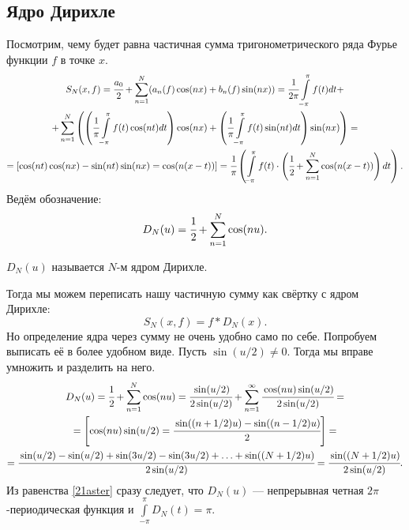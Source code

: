 \subsection{Ядро Дирихле}
Посмотрим, чему будет равна частичная сумма тригонометрического ряда Фурье функции $f$ в точке $x$.
\begin{gather}
	S_N(x,f) = \cfrac{a_0}{2} + \sum\limits_{n=1}^{N}(a_n(f) \cos(nx) + b_n(f) \sin(nx)) = \cfrac{1}{2\pi}\int\limits_{-\pi}^{\pi} f(t)dt +\\
	+\sum\limits_{n=1}^{N}\left(\left( \cfrac{1}{\pi}\int\limits_{-\pi}^{\pi}f(t)\cos(nt) dt\right)\cos(nx) +
	\left( \cfrac{1}{\pi}\int\limits_{-\pi}^{\pi}f(t)\sin(nt) dt\right)\sin(nx) \right) = \\
	= [\cos(nt)\cos(nx) - \sin(nt)\sin(nx) = \cos(n(x-t))] 
	=\cfrac{1}{\pi}\left( \int\limits_{-\pi}^{\pi}f(t) \cdot \left( \cfrac{1}{2} + \sum \limits_{n=1}^{N}\cos(n(x-t))\right)dt\right).
\end{gather}
Ведём обозначение:
$$
	D_N(u) = \cfrac{1}{2} + \sum\limits_{n=1}^{N}\cos (nu).
$$
\begin{Def}
	$D_N(u)$ называется $N$-м ядром Дирихле. 
\end{Def}
Тогда мы можем переписать нашу частичную сумму как свёртку с ядром Дирихле:
\[
	S_N(x, f) = f*D_N(x).\tag{*}
    \label{21aster}
\]
Но определение ядра через сумму не очень удобно само по себе. Попробуем выписать её в более удобном виде. Пусть $\sin(u/2) \neq 0$. Тогда мы вправе умножить и разделить на него.
\begin{gather}
	D_N(u) = \cfrac{1}{2} + \sum\limits_{n=1}^{N}\cos(nu) = \cfrac{\sin(u/2)}{2\sin(u/2)} + \sum\limits_{n=1}^{\infty} \cfrac{\cos(nu)\sin(u/2)}{2\sin(u/2)} =\\
	= \left[\cos(nu)\sin(u/2) = \cfrac{\sin((n + 1/2)u) - \sin((n-1/2)u)}{2}\right]=\\
	= \cfrac{\sin(u/2) - \sin(u/2) + \sin(3u/2) - \sin(3u/2) + \ldots + \sin((N + 1/2)u)}{2\sin(u/2)} = \cfrac{\sin((N + 1/2)u)}{2\sin(u/2)}.
\end{gather}
Из равенства \eqref{21aster} сразу следует, что $D_N(u)$ --- непрерывная четная $2\pi$-периодическая функция и $\int\limits_{-\pi}^{\pi}D_N(t) = \pi.$